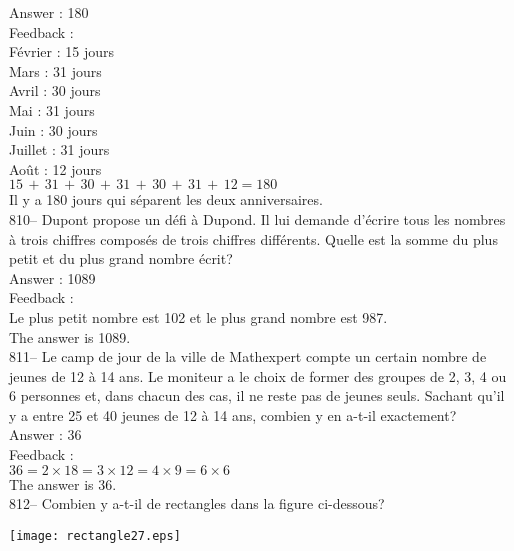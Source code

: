 \documentclass[letterpaper, 12pt]{article}
\begin{document}
Answer : 180\\

Feedback : \\
F\'evrier : 15 jours\\
Mars : 31 jours\\
Avril : 30 jours\\
Mai : 31 jours\\
Juin : 30 jours\\
Juillet : 31 jours\\
Ao\^ut : 12 jours\\

$15\,+\,31\,+\,30\,+\,31\,+\,30\,+\,31\,+\,12=180$\\

Il y a 180 jours qui s\'eparent les deux anniversaires.\\

810-- Dupont propose un d\'efi \`a Dupond.  Il lui demande d'\'ecrire tous
les nombres \`a trois chiffres compos\'es de trois chiffres diff\'erents.
Quelle est la somme du plus petit et du plus grand nombre \'ecrit?\\

Answer : 1089\\

Feedback : \\
Le plus petit nombre est 102 et le plus grand nombre est 987.\\
The answer is 1089.\\

811-- Le camp de jour de la ville de Mathexpert compte un certain nombre de
jeunes de 12 \`a 14 ans.  Le moniteur a le choix de former des groupes de 2,
3, 4 ou 6 personnes et, dans chacun des cas, il ne reste pas de jeunes
seuls.  Sachant qu'il y a entre 25 et 40 jeunes de 12 \`a 14 ans, combien y
en a-t-il exactement?\\

Answer : 36\\

Feedback : \\
$36=2\times18=3\times12=4\times9=6\times6$\\
The answer is 36.\\

812-- Combien y a-t-il de rectangles dans la figure ci-dessous?\\
    \begin{center}
    \texttt{[image: rectangle27.eps]}
    \end{center}
\end{document}
